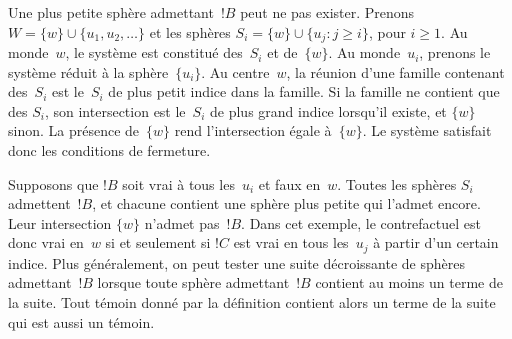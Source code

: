 \documentclass[../../../include/open-logic-section]{subfiles}
\begin{document}
Une plus petite sphère admettant~$!B$ peut ne pas exister.
Prenons $W=\{w\}\cup\{u_1,u_2,\ldots\}$ et les sphères
$S_i=\{w\}\cup\{u_j:j\ge i\}$, pour $i\ge 1$. Au monde~$w$,
le système est constitué des~$S_i$ et de~$\{w\}$. Au monde~$u_i$,
prenons le système réduit à la sphère~$\{u_i\}$. Au centre~$w$,
la réunion d'une famille contenant des~$S_i$ est le~$S_i$ de plus
petit indice dans la famille. Si la famille ne contient que des
$S_i$, son intersection est le~$S_i$ de plus grand indice
lorsqu'il existe, et $\{w\}$ sinon. La présence de~$\{w\}$ rend
l'intersection égale à~$\{w\}$. Le système satisfait donc les
conditions de fermeture.

Supposons que $!B$ soit vrai à tous les~$u_i$ et faux en~$w$.
Toutes les sphères $S_i$ admettent~$!B$, et chacune contient
une sphère plus petite qui l'admet encore. Leur intersection
$\{w\}$ n'admet pas~$!B$. Dans cet exemple, le contrefactuel
est donc vrai en~$w$ si et seulement si $!C$ est vrai en tous
les~$u_j$ à partir d'un certain indice. Plus généralement, on
peut tester une suite décroissante de sphères admettant~$!B$
lorsque toute sphère admettant~$!B$ contient au moins un terme
de la suite. Tout témoin donné par la définition contient alors
un terme de la suite qui est aussi un témoin.
\end{document}
